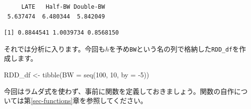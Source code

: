 \documentclass[
  a4paper,
  pandoc,
  ja=standard,
  jafont=haranoaji]{bxjsbook}
\newenvironment{Shaded}{\begin{snugshade}}{\end{snugshade}}
\newcommand{\AttributeTok}[1]{\textcolor[rgb]{0.00,0.48,0.65}{#1}}
\newcommand{\CommentTok}[1]{\textcolor[rgb]{0.37,0.37,0.37}{#1}}
\newcommand{\ControlFlowTok}[1]{\textcolor[rgb]{0.00,0.48,0.65}{#1}}
\newcommand{\DecValTok}[1]{\textcolor[rgb]{0.68,0.00,0.00}{#1}}
\newcommand{\FunctionTok}[1]{\textcolor[rgb]{0.28,0.35,0.67}{#1}}
\newcommand{\NormalTok}[1]{\textcolor[rgb]{0.00,0.48,0.65}{#1}}
\newcommand{\OtherTok}[1]{\textcolor[rgb]{0.00,0.48,0.65}{#1}}
\newcommand{\SpecialCharTok}[1]{\textcolor[rgb]{0.37,0.37,0.37}{#1}}
\begin{document}
\begin{verbatim}
     LATE   Half-BW Double-BW 
 5.637474  6.480344  5.842049 
\end{verbatim}

\begin{Shaded}
\end{Shaded}

\begin{verbatim}
[1] 0.8844541 1.0039734 0.8568150
\end{verbatim}

それでは分析に入ります。今回も\(h\)を予め\texttt{BW}という名の列で格納した\texttt{RDD\_df}を作成します。

\begin{Shaded}
\begin{Highlighting}[numbers=left,,]
\NormalTok{RDD\_df }\OtherTok{\textless{}{-}} \FunctionTok{tibble}\NormalTok{(}\AttributeTok{BW =} \FunctionTok{seq}\NormalTok{(}\DecValTok{100}\NormalTok{, }\DecValTok{10}\NormalTok{, }\AttributeTok{by =} \SpecialCharTok{{-}}\DecValTok{5}\NormalTok{))}
\end{Highlighting}
\end{Shaded}

今回はラムダ式を使わず、事前に関数を定義しておきましょう。関数の自作については第\ref{sec-functions}章を参照してください。

\begin{Shaded}
\end{Shaded}
\end{document}
